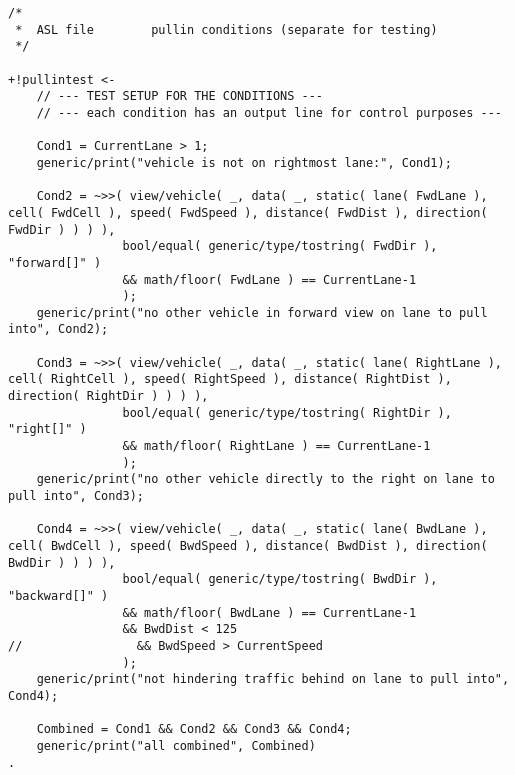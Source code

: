 \newpage

\begin{lstlisting}[style=asl, 
                   keywords={}, 
                   keywords={[2]}, 
                   keywords={[3]}, 
                   caption={Agentenscript: Auszug Bedingungen pullin-Plan},
                   label={lst:pullin-cond}]      
/*
 *  ASL file        pullin conditions (separate for testing)
 */

+!pullintest <-
    // --- TEST SETUP FOR THE CONDITIONS ---
    // --- each condition has an output line for control purposes ---

    Cond1 = CurrentLane > 1;
    generic/print("vehicle is not on rightmost lane:", Cond1);

    Cond2 = ~>>( view/vehicle( _, data( _, static( lane( FwdLane ), cell( FwdCell ), speed( FwdSpeed ), distance( FwdDist ), direction( FwdDir ) ) ) ),
                bool/equal( generic/type/tostring( FwdDir ), "forward[]" ) 
                && math/floor( FwdLane ) == CurrentLane-1
                );
    generic/print("no other vehicle in forward view on lane to pull into", Cond2);

    Cond3 = ~>>( view/vehicle( _, data( _, static( lane( RightLane ), cell( RightCell ), speed( RightSpeed ), distance( RightDist ), direction( RightDir ) ) ) ),
                bool/equal( generic/type/tostring( RightDir ), "right[]" ) 
                && math/floor( RightLane ) == CurrentLane-1
                );
    generic/print("no other vehicle directly to the right on lane to pull into", Cond3);

    Cond4 = ~>>( view/vehicle( _, data( _, static( lane( BwdLane ), cell( BwdCell ), speed( BwdSpeed ), distance( BwdDist ), direction( BwdDir ) ) ) ),
                bool/equal( generic/type/tostring( BwdDir ), "backward[]" ) 
                && math/floor( BwdLane ) == CurrentLane-1
                && BwdDist < 125
//                && BwdSpeed > CurrentSpeed 
                );
    generic/print("not hindering traffic behind on lane to pull into", Cond4);

    Combined = Cond1 && Cond2 && Cond3 && Cond4;
    generic/print("all combined", Combined)
.\end{lstlisting}
